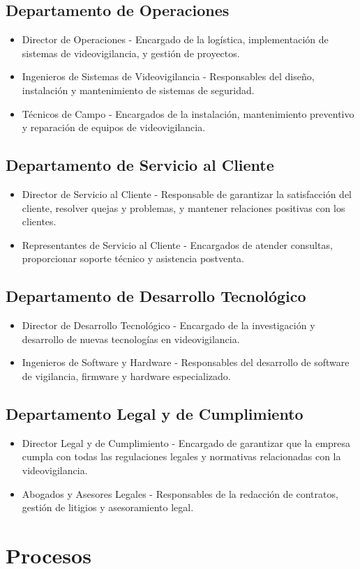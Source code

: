\documentclass{report}
\begin{document}
          \subsection{Departamento de Operaciones}
            \begin{itemize}
            \item Director de Operaciones - Encargado de la logística, implementación de sistemas de videovigilancia, y gestión de proyectos.
            \item Ingenieros de Sistemas de Videovigilancia - Responsables del diseño, instalación y mantenimiento de sistemas de seguridad.
            \item Técnicos de Campo - Encargados de la instalación, mantenimiento preventivo y reparación de equipos de videovigilancia.
            \end{itemize}
          \subsection{Departamento de Servicio al Cliente}
            \begin{itemize}
            \item Director de Servicio al Cliente - Responsable de garantizar la satisfacción del cliente, resolver quejas y problemas, y mantener relaciones positivas con los clientes.
            \item Representantes de Servicio al Cliente - Encargados de atender consultas, proporcionar soporte técnico y asistencia postventa.
            \end{itemize}
          \subsection{Departamento de Desarrollo Tecnológico}
            \begin{itemize}
            \item Director de Desarrollo Tecnológico - Encargado de la investigación y desarrollo de nuevas tecnologías en videovigilancia.
            \item Ingenieros de Software y Hardware - Responsables del desarrollo de software de vigilancia, firmware y hardware especializado.
            \end{itemize}
          \subsection{Departamento Legal y de Cumplimiento}
            \begin{itemize}
            \item Director Legal y de Cumplimiento - Encargado de garantizar que la empresa cumpla con todas las regulaciones legales y normativas relacionadas con la videovigilancia.
            \item Abogados y Asesores Legales - Responsables de la redacción de contratos, gestión de litigios y asesoramiento legal.
            \end{itemize}
        \clearpage\section{Procesos}
\end{document}
